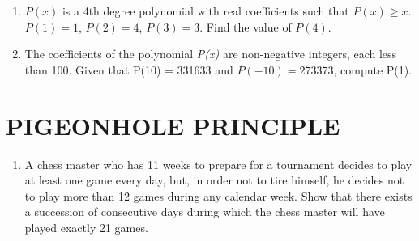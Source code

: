 \documentclass[12pt, letterpaper]{article}
\begin{document}
\begin{enumerate}
    \item $P(x)$ is a 4th degree polynomial with real coefficients such that $P(x) \geq x$.
    $P(1) = 1$, $P(2) = 4$, $P(3) = 3$.
    Find the value of $P(4)$.
    
    \item The coefficients of the polynomial \emph{P(x)} are non-negative integers, each less than 100. Given that
    P(10) = 331633 and \(P(-10) = 273373\), compute P(1).
    
\end{enumerate}

\section{PIGEONHOLE PRINCIPLE}
\begin{enumerate}
    \item A chess master who has 11 weeks to prepare for a tournament decides to play at least one game every day, but, in order not to tire himself, he decides not to play more than 12 games during any calendar week. Show that there exists a succession of consecutive days during which the chess master will have played exactly 21 games.

\end{enumerate}


\vspace{100pt}
\begin{center}
\end{center}
\end{document}
